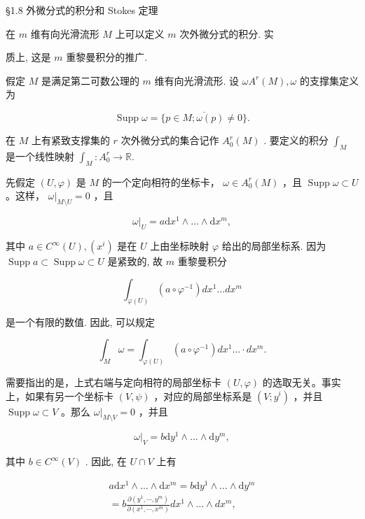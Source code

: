  §1.8 外微分式的积分和 Stokes 定理

在  $m$  维有向光滑流形  $M$  上可以定义  $m$  次外微分式的积分. 实

质上, 这是  $m$  重黎曼积分的推广.

假定  $M$  是满足第二可数公理的  $m$  维有向光滑流形. 设  $\omega A^{r}(M), \omega$  的支撑集定义为

$$
\operatorname {S u p p} \omega = \overline {{\{p \in M ; \omega (p) \neq 0 \}}}.
$$

在  $M$  上有紧致支撑集的  $r$  次外微分式的集合记作  $A_0^r (M)$  . 要定义的积分  $\int_{M}$  是一个线性映射  $\int_{M}:A_{0}^{r}\to \mathbb{R}.$

先假定  $(U, \varphi)$  是  $M$  的一个定向相符的坐标卡， $\omega \in A_0^r(M)$ ，且  $\operatorname{Supp} \omega \subset U$ 。这样， $\omega|_{M \setminus U} = 0$ ，且

$$
\omega | _ {U} = a \mathrm {d} x ^ {1} \wedge \dots \wedge \mathrm {d} x ^ {m}, %
$$

其中  $a \in C^{\infty}(U), (x^{i})$  是在  $U$  上由坐标映射  $\varphi$  给出的局部坐标系. 因为  $\operatorname{Supp} a \subset \operatorname{Supp} \omega \subset U$  是紧致的, 故  $m$  重黎曼积分

$$
\int_ {\varphi (U)} \left(a \circ \varphi^ {- 1}\right) d x ^ {1} \dots d x ^ {m}
$$

是一个有限的数值. 因此, 可以规定

$$
\int_ {M} \omega = \int_ {\varphi (U)} \left(a \circ \varphi^ {- 1}\right) d x ^ {1} \dots \cdot d x ^ {m}. %
$$

需要指出的是，上式右端与定向相符的局部坐标卡  $(U, \varphi)$  的选取无关。事实上，如果有另一个坐标卡  $(V, \psi)$ ，对应的局部坐标系是  $(V; y^i)$ ，并且  $\operatorname{Supp} \omega \subset V$ 。那么  $\omega|_{M \setminus V} = 0$ ，并且

$$
\omega | _ {V} = b \mathrm {d} y ^ {1} \wedge \dots \wedge \mathrm {d} y ^ {m},
$$

其中  $b \in C^{\infty}(V)$ . 因此, 在  $U \cap V$  上有

$$
\begin{array}{l} a \mathrm {d} x ^ {1} \wedge \dots \wedge \mathrm {d} x ^ {m} = b \mathrm {d} y ^ {1} \wedge \dots \wedge \mathrm {d} y ^ {m} \\ = b \frac {\partial (y ^ {1} , \cdots , y ^ {m})}{\partial (x ^ {1} , \cdots , x ^ {m})} d x ^ {1} \wedge \dots \wedge d x ^ {m}, \\ \end{array}
$$


